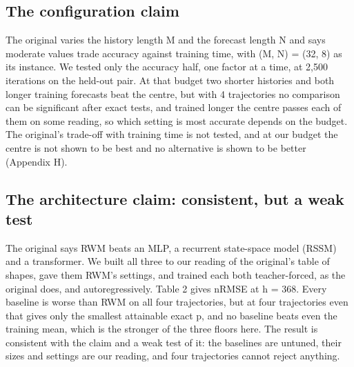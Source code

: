 \documentclass[10pt]{article}
\begin{document}
\subsection{The configuration claim}

The original varies the history length M and the forecast length N and says moderate values trade accuracy against training time, with (M, N) = (32, 8) as its instance. We tested only the accuracy half, one factor at a time, at 2,500 iterations on the held-out pair. At that budget two shorter histories and both longer training forecasts beat the centre, but with 4 trajectories no comparison can be significant after exact tests, and trained longer the centre passes each of them on some reading, so which setting is most accurate depends on the budget. The original's trade-off with training time is not tested, and at our budget the centre is not shown to be best and no alternative is shown to be better (Appendix H).

\subsection{The architecture claim: consistent, but a weak test}

The original says RWM beats an MLP, a recurrent state-space model (RSSM) and a transformer. We built all three to our reading of the original's table of shapes, gave them RWM's settings, and trained each both teacher-forced, as the original does, and autoregressively. Table 2 gives nRMSE at h = 368. Every baseline is worse than RWM on all four trajectories, but at four trajectories even that gives only the smallest attainable exact p, and no baseline beats even the training mean, which is the stronger of the three floors here. The result is consistent with the claim and a weak test of it: the baselines are untuned, their sizes and settings are our reading, and four trajectories cannot reject anything.

\begin{center}\small{}\end{center}
\end{document}
